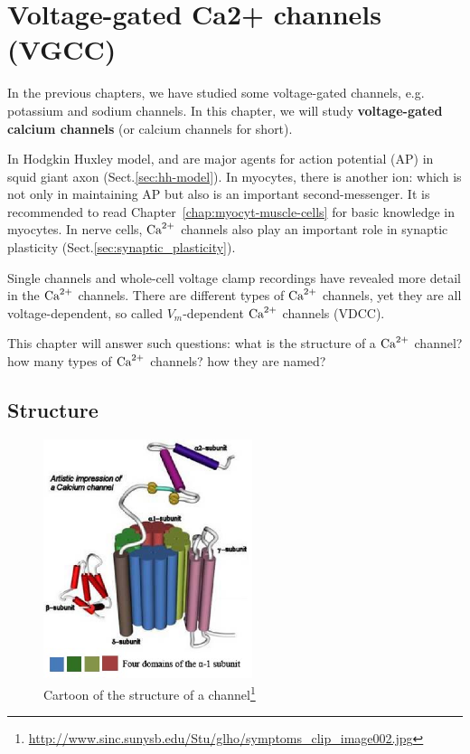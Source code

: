 
\chapter{Voltage-gated Ca2+ channels (VGCC)}
\label{chap:voltage-gated-ceca2+}
\label{chap:VDCC_Intro}
\label{sec:VGCC}

In the previous chapters, we have studied some voltage-gated channels, e.g.
potassium and sodium channels. In this chapter, we will study {\bf voltage-gated
calcium channels} (or calcium channels for short).

In Hodgkin Huxley model,  and  are major agents for action
potential (AP) in squid giant axon (Sect.\ref{sec:hh-model}).
In myocytes, there is another ion:  which is not only in maintaining
AP but also is an important second-messenger.  It is recommended to read
Chapter~\ref{chap:myocyt-muscle-cells} for basic knowledge in myocytes. In nerve
cells, ${\text{Ca}^{2+}}$ channels also play an important role in synaptic plasticity
(Sect.\ref{sec:synaptic_plasticity}).

Single channels and whole-cell voltage clamp recordings have revealed more
detail in the ${\text{Ca}^{2+}}$ channels. There are different types of ${\text{Ca}^{2+}}$ channels, yet
they are all voltage-dependent, so called $V_m$-dependent ${\text{Ca}^{2+}}$ channels (VDCC).

This chapter will answer such questions: what is the structure of a ${\text{Ca}^{2+}}$
channel? how many types of ${\text{Ca}^{2+}}$ channels? how they are named? 

\section{Structure}
\label{sec:structure-1}


\begin{figure}[htb]
  \centerline{\includegraphics[height=7cm]{./images/Ca-channel-structure.eps}}
  \caption{Cartoon of the structure of a 
  channel\footnote{\url{http://www.sinc.sunysb.edu/Stu/glho/symptoms_clip_image002.jpg}}}\label{fig:ca_channel_structure}
\end{figure}

